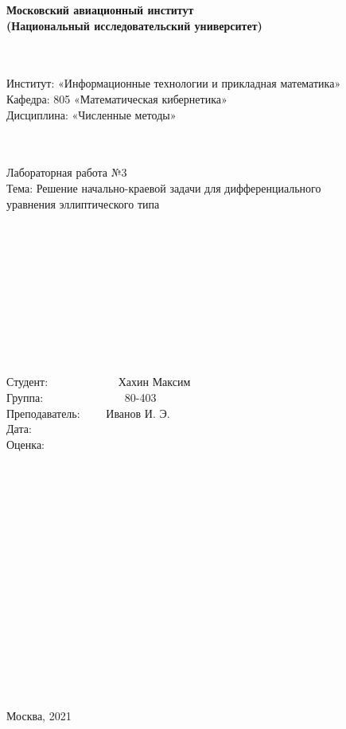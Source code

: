 \documentclass[12pt]{article}
\begin{document}
    \begin{center}
        \textbf{Московский авиационный институт} \\
        \textbf{(Национальный исследовательский университет)}
    \end{center} 
    ~\\
    ~\\
    Институт: «Информационные технологии и прикладная математика» \\
    Кафедра: 805 «Математическая кибернетика»  \\
    Дисциплина: «Численные методы»  
    ~\\
    ~\\
    ~\\
    \begin{center}
        Лабораторная работа №3 \\
        Тема: Решение начально-краевой задачи для дифференциального\\ уравнения 
        эллиптического типа
    \end{center}
    ~\\
    ~\\
    ~\\
    ~\\
    ~\\
    ~\\
    ~\\
    ~\\
    ~\\
    \begin{flushright}
        Студент: ~~~~~~~~~~~~Хахин Максим~~~~~~\\
        Группа: ~~~~~~~~~~~~~~80-403~~~~~~~~~~~~~~~~~\\
        Преподаватель: ~~~~Иванов И. Э.~~~~~~~\\
        Дата: ~~~~~~~~~~~~~~~~~~~~~~~~~~~~~~~~~~~~~~~~~~~\\
        Оценка: ~~~~~~~~~~~~~~~~~~~~~~~~~~~~~~~~~~~~~~~~\\
    \end{flushright}
    ~\\
    ~\\
    ~\\
    ~\\
    ~\\
    ~\\
    ~\\
    ~\\
    ~\\
    ~\\
    ~\\
    ~\\
    ~\\
    ~\\
    ~\\
    \begin{center}
        Москва, 2021
    \end{center}
    \pagestyle{empty}
    \newpage
\end{document}

